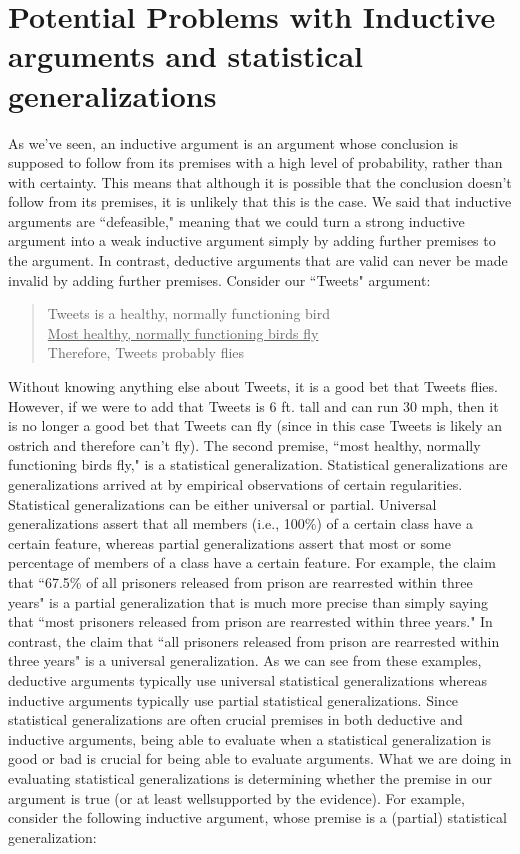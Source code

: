 \section{Potential Problems with Inductive arguments and statistical generalizations}
As we've seen, an inductive argument is an argument
whose conclusion is supposed to follow from its premises with a high level of
probability, rather than with certainty. This means that although it is possible
that the conclusion doesn't follow from its premises, it is unlikely that this is the
case. We said that inductive arguments are ``defeasible," meaning that we
could turn a strong inductive argument into a weak inductive argument simply
by adding further premises to the argument. In contrast, deductive arguments
that are valid can never be made invalid by adding further premises. Consider our
``Tweets" argument:\\

\begin{quote}
Tweets is a healthy, normally functioning bird\\
\underline{Most healthy, normally functioning birds fly} \\
Therefore, Tweets probably flies \\
\end{quote}

Without knowing anything else about Tweets, it is a good bet that Tweets flies.
However, if we were to add that Tweets is 6 ft. tall and can run 30 mph, then it is
no longer a good bet that Tweets can fly (since in this case Tweets is likely an
ostrich and therefore can't fly). The second premise, ``most healthy, normally
functioning birds fly," is a statistical generalization. Statistical generalizations
are generalizations arrived at by empirical observations of certain regularities.
Statistical generalizations can be either universal or partial.
Universal
generalizations assert that all members (i.e., 100\%) 
of a certain class have a
certain feature, whereas partial generalizations assert that most or some
percentage of members of a class have a certain feature. For example, the
claim that ``67.5\% 
of all prisoners released from prison are rearrested within
three years" is a partial generalization that is much more precise than simply
saying that ``most prisoners released from prison are rearrested within three
years." In contrast, the claim that ``all prisoners released from prison are
rearrested within three years" is a universal generalization. As we can see from
these examples, deductive arguments typically use universal statistical
generalizations whereas inductive arguments typically use partial statistical
generalizations. Since statistical generalizations are often crucial premises in
both deductive and inductive arguments, being able to evaluate when a
statistical generalization is good or bad is crucial for being able to evaluate
arguments. What we are doing in evaluating statistical generalizations is
determining whether the premise in our argument is true (or at least wellsupported 
by the evidence). For example, consider the following inductive
argument, whose premise is a (partial) statistical generalization:\\


